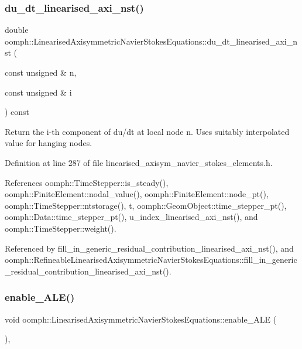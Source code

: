 \subsubsection{\texorpdfstring{du\+\_\+dt\+\_\+linearised\+\_\+axi\+\_\+nst()}{du\_dt\_linearised\_axi\_nst()}}
{\footnotesize\ttfamily double oomph\+::\+Linearised\+Axisymmetric\+Navier\+Stokes\+Equations\+::du\+\_\+dt\+\_\+linearised\+\_\+axi\+\_\+nst (\begin{DoxyParamCaption}\item[{const unsigned \&}]{n,  }\item[{const unsigned \&}]{i }\end{DoxyParamCaption}) const\hspace{0.3cm}{\ttfamily [inline]}}



Return the i-\/th component of du/dt at local node n. Uses suitably interpolated value for hanging nodes. 



Definition at line 287 of file linearised\+\_\+axisym\+\_\+navier\+\_\+stokes\+\_\+elements.\+h.



References oomph\+::\+Time\+Stepper\+::is\+\_\+steady(), oomph\+::\+Finite\+Element\+::nodal\+\_\+value(), oomph\+::\+Finite\+Element\+::node\+\_\+pt(), oomph\+::\+Time\+Stepper\+::ntstorage(), t, oomph\+::\+Geom\+Object\+::time\+\_\+stepper\+\_\+pt(), oomph\+::\+Data\+::time\+\_\+stepper\+\_\+pt(), u\+\_\+index\+\_\+linearised\+\_\+axi\+\_\+nst(), and oomph\+::\+Time\+Stepper\+::weight().



Referenced by fill\+\_\+in\+\_\+generic\+\_\+residual\+\_\+contribution\+\_\+linearised\+\_\+axi\+\_\+nst(), and oomph\+::\+Refineable\+Linearised\+Axisymmetric\+Navier\+Stokes\+Equations\+::fill\+\_\+in\+\_\+generic\+\_\+residual\+\_\+contribution\+\_\+linearised\+\_\+axi\+\_\+nst().

\mbox{\label{classoomph_1_1LinearisedAxisymmetricNavierStokesEquations_a843423bcd60e1dcb8693ea7c767f0a51}} 
\subsubsection{\texorpdfstring{enable\+\_\+\+A\+L\+E()}{enable\_ALE()}}
{\footnotesize\ttfamily void oomph\+::\+Linearised\+Axisymmetric\+Navier\+Stokes\+Equations\+::enable\+\_\+\+A\+LE (\begin{DoxyParamCaption}{ }\end{DoxyParamCaption})\hspace{0.3cm}{\ttfamily [inline]}, {\ttfamily [virtual]}}



